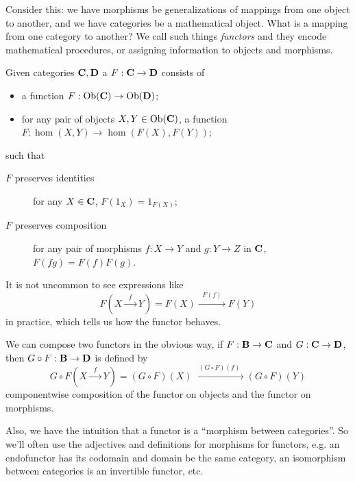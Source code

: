 Consider this: we have morphisms be generalizations of mappings
from one object to another, and we have categories be a
mathematical object. What is a mapping from one category to
another? We call such things \emph{functors} and they encode
mathematical procedures, or assigning information to objects and
morphisms.

\begin{defn}\label{defn:functor}
Given categories $\mathbf{C},\mathbf{D}$ a 
$F:\mathbf{C}\to\mathbf{D}$ consists of
\begin{itemize}
\item a function $F:\operatorname{Ob}(\mathbf{C})\to\operatorname{Ob}(\mathbf{D})$;
\item for any pair of objects $X,Y\in\operatorname{Ob}(\mathbf{C})$, a function
  $F:\hom(X,Y)\to\hom(F(X),F(Y))$;
\end{itemize}
such that 
\begin{description}
\item[$F$ preserves identities] for any $X\in\mathbf{C}$,
  $F(1_{X})=1_{F(X)}$;
\item[$F$ preserves composition] for any pair of morphisms
  $f:X\to Y$ and $g:Y\to{}Z$ in $\mathbf{C}$, $F(fg)=F(f)F(g)$.
\end{description}
\end{defn}
\begin{rmk}
It is not uncommon to see expressions like
\begin{equation}
F\left(X\xrightarrow{\;\;f\;\;}Y\right) = F(X)\xrightarrow{\;\;F(f)\;\;}F(Y)
\end{equation}
in practice, which tells us how the functor behaves.

We can compose two functors in the obvious way, if
$F:\mathbf{B}\to\mathbf{C}$ and $G:\mathbf{C}\to\mathbf{D}$, then
$G\circ{}F:\mathbf{B}\to\mathbf{D}$ is defined by
\begin{equation}
G\circ{}F\left(X\xrightarrow{\;\;f\;\;}Y\right) = (G\circ{}F)(X)\xrightarrow{\;\;(G\circ{}F)(f)\;\;}(G\circ{}F)(Y)
\end{equation}
componentwise composition of the functor on objects and the
functor on morphisms.

Also, we have the intuition that a functor is a ``morphism
between categories''. So we'll often use the adjectives and
definitions for morphisms for functors, e.g. an endofunctor has
its codomain and domain be the same category, an isomorphism
between categories is an invertible functor, etc.
\end{rmk}

